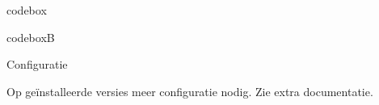

\begin{saveblock}{codebox}
	\begin{highlightblock}
		\usepackage[backend=biber]{biblatex}
	\end{highlightblock}
\end{saveblock}

\begin{saveblock}{codeboxB}
	\begin{highlightblock}
	\end{highlightblock}
\end{saveblock}

\begin{frame}{Configuratie}

	\bigskip

	Op ge\"installeerde versies meer configuratie nodig. Zie extra documentatie.

\end{frame}

	



	
		
			

